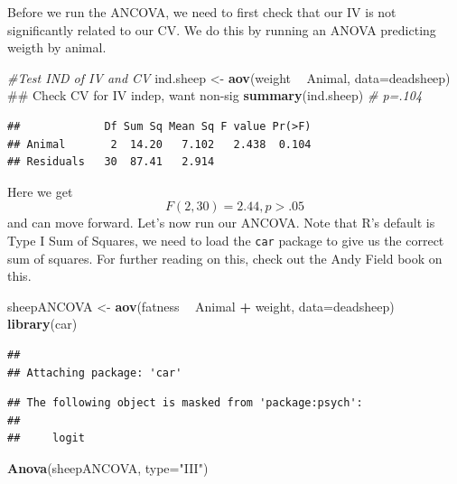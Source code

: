 \documentclass[]{book}
\newenvironment{Shaded}{\begin{snugshade}}{\end{snugshade}}
\newcommand{\KeywordTok}[1]{\textcolor[rgb]{0.13,0.29,0.53}{\textbf{#1}}}
\newcommand{\DataTypeTok}[1]{\textcolor[rgb]{0.13,0.29,0.53}{#1}}
\newcommand{\StringTok}[1]{\textcolor[rgb]{0.31,0.60,0.02}{#1}}
\newcommand{\CommentTok}[1]{\textcolor[rgb]{0.56,0.35,0.01}{\textit{#1}}}
\newcommand{\OperatorTok}[1]{\textcolor[rgb]{0.81,0.36,0.00}{\textbf{#1}}}
\newcommand{\NormalTok}[1]{#1}
\theoremstyle{definition}
\theoremstyle{definition}
\theoremstyle{definition}
\theoremstyle{remark}
\begin{document}
Before we run the ANCOVA, we need to first check that our IV is not
significantly related to our CV. We do this by running an ANOVA
predicting weigth by animal.

\begin{Shaded}
\begin{Highlighting}[]
\CommentTok{#Test IND of IV and CV}
\NormalTok{ind.sheep <-}\StringTok{ }\KeywordTok{aov}\NormalTok{(weight }\OperatorTok{~}\StringTok{ }\NormalTok{Animal, }\DataTypeTok{data=}\NormalTok{deadsheep) ## Check CV for IV indep, want non-sig}
\KeywordTok{summary}\NormalTok{(ind.sheep) }\CommentTok{# p=.104}
\end{Highlighting}
\end{Shaded}

\begin{verbatim}
##             Df Sum Sq Mean Sq F value Pr(>F)
## Animal       2  14.20   7.102   2.438  0.104
## Residuals   30  87.41   2.914
\end{verbatim}

Here we get\[ F(2,30) = 2.44, p> .05\] and can move forward. Let's now
run our ANCOVA. Note that R's default is Type I Sum of Squares, we need
to load the \texttt{car} package to give us the correct sum of squares.
For further reading on this, check out the Andy Field book on this.

\begin{Shaded}
\begin{Highlighting}[]
\NormalTok{sheepANCOVA <-}\StringTok{ }\KeywordTok{aov}\NormalTok{(fatness }\OperatorTok{~}\StringTok{ }\NormalTok{Animal }\OperatorTok{+}\StringTok{ }\NormalTok{weight, }\DataTypeTok{data=}\NormalTok{deadsheep)}
\KeywordTok{library}\NormalTok{(car)}
\end{Highlighting}
\end{Shaded}

\begin{verbatim}
## 
## Attaching package: 'car'
\end{verbatim}

\begin{verbatim}
## The following object is masked from 'package:psych':
## 
##     logit
\end{verbatim}

\begin{Shaded}
\begin{Highlighting}[]
\KeywordTok{Anova}\NormalTok{(sheepANCOVA, }\DataTypeTok{type=}\StringTok{"III"}\NormalTok{)}
\end{Highlighting}
\end{Shaded}
\end{document}
